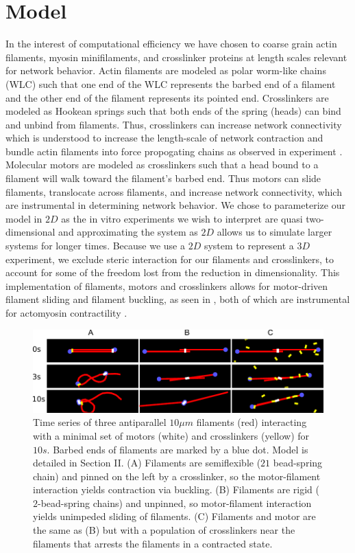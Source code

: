 \documentclass[12pt]{article}
\begin{document}
\section{Model}  
In the interest of computational efficiency we have chosen to coarse grain actin filaments, myosin minifilaments, and
crosslinker proteins at length scales relevant for network behavior. Actin filaments are
modeled as polar worm-like chains (WLC) such that one end of the WLC represents the barbed end of a filament and the
other end of the filament represents its pointed end.  
Crosslinkers are modeled as Hookean springs such
that both ends of the spring (heads) can bind and unbind from filaments. Thus, crosslinkers can increase network connectivity
which is understood to increase the length-scale of network contraction \cite{murrell2015} and bundle actin filaments
into force propogating chains as observed in experiment \cite{gardel2004, murrell2012, murrell2014, freedman2016}. 
Molecular motors are modeled as crosslinkers such
that a head bound to a filament will walk toward the filament's barbed end. Thus motors can slide filaments,
translocate across filaments, and increase network connectivity, which are instrumental in determining
network behavior\cite{murrell2014}. We chose to parameterize our model in $2D$ as the in vitro experiments we wish to
interpret are quasi two-dimensional \cite{murrellTalk} and
approximating the system as $2D$ allows us to simulate larger systems for longer times. Because we use a $2D$ system to
represent a $3D$ experiment, we exclude steric interaction for our filaments and crosslinkers, to account for
some of the freedom lost from the reduction in dimensionality. This implementation of filaments, motors and crosslinkers allows for 
motor-driven filament sliding and filament buckling, as seen in ,
both of which are instrumental for actomyosin contractility \cite{murrell2012}.
\begin{figure}[H]  
  \centering
  \includegraphics[width=\textwidth]{figs/minimal.pdf}
  \caption{
  \label{fig:toys}%
  Time series of three antiparallel $10\mu m$ filaments (red) interacting with a
  minimal set of motors (white) and crosslinkers (yellow) for $10s$. Barbed ends
  of filaments are marked by a blue dot. Model is detailed in Section II.   
  (A) Filaments are semiflexible ($21$ bead-spring chain) and pinned on the left
  by a crosslinker, so the motor-filament interaction yields contraction via buckling. 
  (B) Filaments are rigid ($2$-bead-spring chains) and unpinned, so 
  motor-filament interaction yields unimpeded sliding of filaments.
  (C) Filaments and motor are the same as (B) but with a population of
crosslinkers near the filaments that arrests the filaments in a contracted state. } 
\end{figure}
\end{document}
